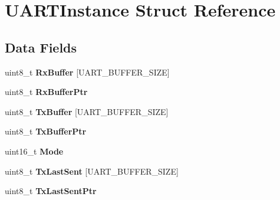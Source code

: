 \hypertarget{struct_u_a_r_t_instance}{\section{U\-A\-R\-T\-Instance Struct Reference}
\label{struct_u_a_r_t_instance}
}
\subsection*{Data Fields}
\begin{DoxyCompactItemize}
\item 
\hypertarget{struct_u_a_r_t_instance_a19e526bc57bbb10939b53ea13eee30fa}{uint8\-\_\-t {\bfseries Rx\-Buffer} \mbox{[}U\-A\-R\-T\-\_\-\-B\-U\-F\-F\-E\-R\-\_\-\-S\-I\-Z\-E\mbox{]}}\label{struct_u_a_r_t_instance_a19e526bc57bbb10939b53ea13eee30fa}

\item 
\hypertarget{struct_u_a_r_t_instance_a207dabce7103416b36680d9ecc050684}{uint8\-\_\-t {\bfseries Rx\-Buffer\-Ptr}}\label{struct_u_a_r_t_instance_a207dabce7103416b36680d9ecc050684}

\item 
\hypertarget{struct_u_a_r_t_instance_a77d9f6986b01073dd0d2385d2e34f961}{uint8\-\_\-t {\bfseries Tx\-Buffer} \mbox{[}U\-A\-R\-T\-\_\-\-B\-U\-F\-F\-E\-R\-\_\-\-S\-I\-Z\-E\mbox{]}}\label{struct_u_a_r_t_instance_a77d9f6986b01073dd0d2385d2e34f961}

\item 
\hypertarget{struct_u_a_r_t_instance_ada90140ddc0177a452e32c0a1268f0fe}{uint8\-\_\-t {\bfseries Tx\-Buffer\-Ptr}}\label{struct_u_a_r_t_instance_ada90140ddc0177a452e32c0a1268f0fe}

\item 
\hypertarget{struct_u_a_r_t_instance_a6cdb50e2027bf68b7ad66e2863c1ae29}{uint16\-\_\-t {\bfseries Mode}}\label{struct_u_a_r_t_instance_a6cdb50e2027bf68b7ad66e2863c1ae29}

\item 
\hypertarget{struct_u_a_r_t_instance_ac79c2c5b8bc7ae929e76b44e9b0d71a8}{uint8\-\_\-t {\bfseries Tx\-Last\-Sent} \mbox{[}U\-A\-R\-T\-\_\-\-B\-U\-F\-F\-E\-R\-\_\-\-S\-I\-Z\-E\mbox{]}}\label{struct_u_a_r_t_instance_ac79c2c5b8bc7ae929e76b44e9b0d71a8}

\item 
\hypertarget{struct_u_a_r_t_instance_a61c194974dc7b5951c59543ecbf6c651}{uint8\-\_\-t {\bfseries Tx\-Last\-Sent\-Ptr}}\label{struct_u_a_r_t_instance_a61c194974dc7b5951c59543ecbf6c651}

\end{DoxyCompactItemize}


